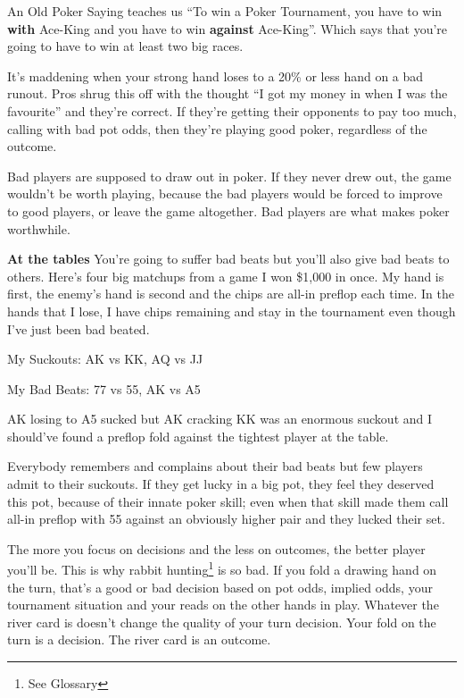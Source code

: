 An Old Poker Saying teaches us ``To win a
Poker Tournament, you have to win \textbf{with} Ace-King and
you have to win \textbf{against} Ace-King''. Which says that you're
going to have to win at least two big races.

It's maddening when your strong hand loses to a 20\% or less
hand on a bad runout. Pros shrug this off with
the thought ``I got my money in when I was the favourite'' and they're
correct. If they're getting their opponents to pay too much, calling
with bad pot odds, then they're playing good poker, regardless of
the outcome.

Bad players are supposed to draw out in poker. If they never drew
out, the game wouldn't be worth playing, because the bad players
would be forced to improve to good players, or leave the game
altogether. Bad players are what makes poker worthwhile.

\textbf{At the tables} You're going to suffer bad beats but you'll
also give bad beats to others. Here's four big matchups from a game
I won \$1,000 in once. My hand is first, the enemy's hand is second
and the chips are all-in preflop each time. In the hands that I
lose, I have chips remaining and stay in the tournament even
though I've just been bad beated.

My Suckouts: AK vs KK, AQ vs JJ

My Bad Beats: 77 vs 55, AK vs A5

AK losing to A5 sucked but AK cracking KK was an enormous suckout and
I should've found a preflop fold against the tightest player at the
table.

Everybody remembers and complains about their bad beats but few
players admit to their suckouts. If they get lucky in a big pot, they
feel they deserved this pot, because of their innate poker skill;
even when that skill made them call all-in preflop with 55 against an
obviously higher pair and they lucked their set.


The more you focus on decisions and the less on outcomes, the
better player you'll be. This is why rabbit hunting\footnote{See
Glossary} is so bad. If you fold a drawing hand on the turn, that's a
good or bad decision based on pot odds, implied odds, your tournament
situation and your reads on the other hands in play. Whatever the
river card is doesn't change the quality of your turn decision. Your
fold on the turn is a decision. The river card is an outcome.

